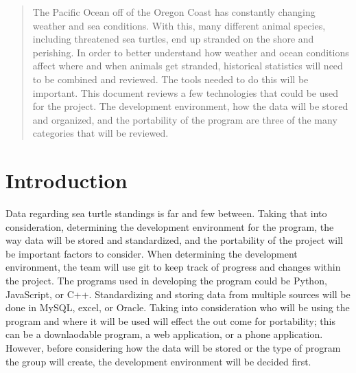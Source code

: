 \documentclass[onecolumn, draftclsnofoot,10pt, compsoc]{IEEEtran}
\begin{document}
\begin{titlepage}
\begin{singlespace}
\begin{abstract}
        \noindent The Pacific Ocean off of the Oregon Coast has constantly changing weather and sea conditions.  With this, many different animal species, including threatened sea turtles, end up stranded on the shore and perishing. In order to better understand how weather and ocean conditions affect where and when animals get stranded, historical statistics will need to be combined and reviewed. The tools needed to do this will be important. This document reviews a few technologies that could be used for the project. The development environment, how the data will be stored and organized, and the portability of the program are three of the many categories that will be reviewed. 
        \end{abstract}     
    \end{singlespace}
\end{titlepage}

\newpage
{}

\tableofcontents
\newpage

\section{Introduction}
Data regarding sea turtle standings is far and few between. Taking that into consideration, determining the development environment for the program, the way data will be stored and standardized, and the portability of the project will be important factors to consider. When determining the development environment, the team will use git to keep track of progress and changes within the project. The programs used in developing the program could be Python, JavaScript, or C++. Standardizing and storing data from multiple sources will be done in MySQL, excel, or Oracle. Taking into consideration who will be using the program and where it will be used will effect the out come for portability; this can be a downlaodable program, a web application, or a phone application. However, before considering how the data will be stored or the type of program the group will create, the development environment will be decided first. 
\end{document}
